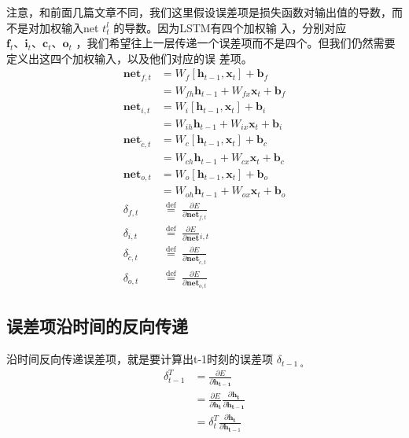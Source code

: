 \documentclass[10.5pt,compsoc]{CjC}
\theoremstyle{mystyle}
\begin{document}
注意，和前面几篇文章不同，我们这里假设误差项是损失函数对输出值的导数，而不是对加权输入net $t_{t}^{l}$ 的导数。因为LSTM有四个加权输 入，分别对应 $\mathbf{f}_{t} 、 \mathbf{i}_{t} 、 \mathbf{c}_{t} 、 \mathbf{o}_{t}$ ，我们希望往上一层传递一个误差项而不是四个。但我们仍然需要定义出这四个加权输入，以及他们对应的误 差项。
$$
\begin{aligned}
\mathbf{n e t}_{f, t} &=W_{f}\left[\mathbf{h}_{t-1}, \mathbf{x}_{t}\right]+\mathbf{b}_{f} \\
&=W_{f h} \mathbf{h}_{t-1}+W_{f x} \mathbf{x}_{t}+\mathbf{b}_{f} \\
\mathbf{n e t}_{i, t} &=W_{i}\left[\mathbf{h}_{t-1}, \mathbf{x}_{t}\right]+\mathbf{b}_{i} \\
&=W_{i h} \mathbf{h}_{t-1}+W_{i x} \mathbf{x}_{t}+\mathbf{b}_{i} \\
\mathbf{n e t}_{\tilde{c}, t} &=W_{c}\left[\mathbf{h}_{t-1}, \mathbf{x}_{t}\right]+\mathbf{b}_{c} \\
&=W_{c h} \mathbf{h}_{t-1}+W_{c x} \mathbf{x}_{t}+\mathbf{b}_{c} \\
\mathbf{n e t}_{o, t} &=W_{o}\left[\mathbf{h}_{t-1}, \mathbf{x}_{t}\right]+\mathbf{b}_{o} \\
&=W_{o h} \mathbf{h}_{t-1}+W_{o x} \mathbf{x}_{t}+\mathbf{b}_{o} \\
\delta_{f, t} & \stackrel{\text { def }}{=} \frac{\partial E}{\partial \mathbf{n e t}_{f, t}} \\
\delta_{i, t} & \stackrel{\text { def }}{=} \frac{\partial E}{\partial \mathbf{n e t}}{ }_{i, t} \\
\delta_{\tilde{c}, t} & \stackrel{\text { def }}{=} \frac{\partial E}{\partial \mathbf{n e t}_{\tilde{c}, t}} \\
\delta_{o, t} & \stackrel{\text { def }}{=} \frac{\partial E}{\partial \mathbf{n e t}_{o, t}}
\end{aligned}
$$

{\heiti \subsection{误差项沿时间的反向传递} }
沿时间反向传递误差项，就是要计算出t-1时刻的误差项 $\delta_{t-1 \text { 。 }}$
$$
\begin{aligned}
\delta_{t-1}^{T} &=\frac{\partial E}{\partial \mathbf{h}_{\mathbf{t}-\mathbf{1}}} \\
&=\frac{\partial E}{\partial \mathbf{h}_{\mathbf{t}}} \frac{\partial \mathbf{h}_{\mathbf{t}}}{\partial \mathbf{h}_{\mathbf{t}-\mathbf{1}}} \\
&=\delta_{t}^{T} \frac{\partial \mathbf{h}_{\mathbf{t}}}{\partial \mathbf{h}_{\mathbf{t}-1}}
\end{aligned}
$$
\end{document}
